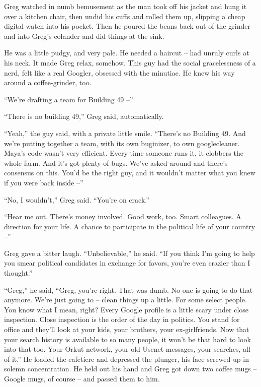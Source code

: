 Greg watched in numb bemusement as the man took off his jacket and hung 
it over a kitchen chair, then undid his cuffs and rolled them up, 
slipping a cheap digital watch into his pocket. Then he poured the 
beans back out of the grinder and into Greg's colander and did things 
at the sink.

He was a little pudgy, and very pale. He needed a haircut -- had unruly 
curls at his neck. It made Greg relax, somehow. This guy had the social 
gracelessness of a nerd, felt like a real Googler, obsessed with the 
minutiae. He knew his way around a coffee-grinder, too.

“We're drafting a team for Building 49 --”

“There is no building 49,” Greg said, automatically.

“Yeah,” the guy said, with a private little smile. “There's no 
Building 49. And we're putting together a team, with its own buginizer, 
to own googlecleaner. Maya's code wasn't very efficient. Every time 
someone runs it, it clobbers the whole farm. And it's got plenty of 
bugs. We've asked around and there's consensus on this. You'd be the 
right guy, and it wouldn't matter what you knew if you were back inside 
--”

“No, I wouldn't,” Greg said. “You're on crack.”

“Hear me out. There's money involved. Good work, too. Smart 
colleagues. A direction for your life. A chance to participate in the 
political life of your country --”

Greg gave a bitter laugh. “Unbelievable,” he said. “If you think 
I'm going to help you smear political candidates in exchange for 
favors, you're even crazier than I thought.”

“Greg,” he said, “Greg, you're right. That was dumb. No one is 
going to do that anymore. We're just going to -- clean things up a 
little. For some select people. You know what I mean, right? Every 
Google profile is a little scary under close inspection. Close 
inspection is the order of the day in politics. You stand for office 
and they'll look at your kids, your brothers, your ex-girlfriends. Now 
that your search history is available to so many people, it won't be 
that hard to look into that too. Your Orkut network, your old Usenet 
messages, your searches, all of it.” He loaded the cafetiere and 
depressed the plunger, his face screwed up in solemn concentration. He 
held out his hand and Greg got down two coffee mugs -- Google mugs, of 
course -- and passed them to him.

